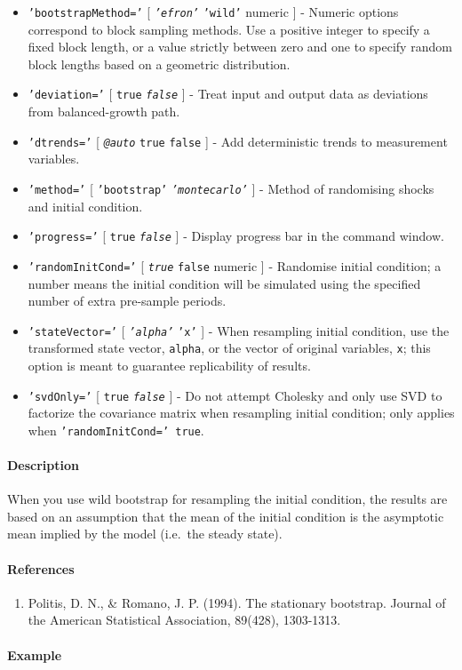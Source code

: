 \begin{itemize}
\item
  \texttt{'bootstrapMethod='} {[} \emph{\texttt{'efron'}} \textbar{}
  \texttt{'wild'} \textbar{} numeric {]} - Numeric options correspond to
  block sampling methods. Use a positive integer to specify a fixed
  block length, or a value strictly between zero and one to specify
  random block lengths based on a geometric distribution.
\item
  \texttt{'deviation='} {[} \texttt{true} \textbar{}
  \emph{\texttt{false}} {]} - Treat input and output data as deviations
  from balanced-growth path.
\item
  \texttt{'dtrends='} {[} \emph{\texttt{@auto}} \textbar{} \texttt{true}
  \textbar{} \texttt{false} {]} - Add deterministic trends to
  measurement variables.
\item
  \texttt{'method='} {[} \texttt{'bootstrap'} \textbar{}
  \emph{\texttt{'montecarlo'}} {]} - Method of randomising shocks and
  initial condition.
\item
  \texttt{'progress='} {[} \texttt{true} \textbar{}
  \emph{\texttt{false}} {]} - Display progress bar in the command
  window.
\item
  \texttt{'randomInitCond='} {[} \emph{\texttt{true}} \textbar{}
  \texttt{false} \textbar{} numeric {]} - Randomise initial condition; a
  number means the initial condition will be simulated using the
  specified number of extra pre-sample periods.
\item
  \texttt{'stateVector='} {[} \emph{\texttt{'alpha'}} \textbar{}
  \texttt{'x'} {]} - When resampling initial condition, use the
  transformed state vector, \texttt{alpha}, or the vector of original
  variables, \texttt{x}; this option is meant to guarantee replicability
  of results.
\item
  \texttt{'svdOnly='} {[} \texttt{true} \textbar{} \emph{\texttt{false}}
  {]} - Do not attempt Cholesky and only use SVD to factorize the
  covariance matrix when resampling initial condition; only applies when
  \texttt{'randomInitCond=' true}.
\end{itemize}

\paragraph{Description}

When you use wild bootstrap for resampling the initial condition, the
results are based on an assumption that the mean of the initial
condition is the asymptotic mean implied by the model (i.e.~the steady
state).

\paragraph{References}

\begin{enumerate}
\def\labelenumi{\arabic{enumi}.}
\itemsep1pt\parskip0pt
\item
  Politis, D. N., \& Romano, J. P. (1994). The stationary bootstrap.
  Journal of the American Statistical Association, 89(428), 1303-1313.
\end{enumerate}

\paragraph{Example}


